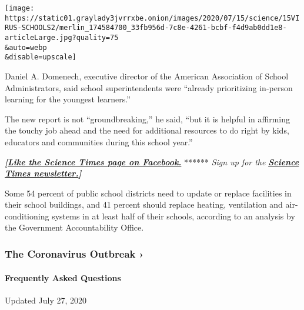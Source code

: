 \texttt{[image: https://static01.graylady3jvrrxbe.onion/images/2020/07/15/science/15VIRUS-SCHOOLS2/merlin\_174584700\_33fb956d-7c8e-4261-bcbf-f4d9ab0dd1e8-articleLarge.jpg?quality=75\\\&auto=webp\\\&disable=upscale]}

Daniel A. Domenech, executive director of the American Association of
School Administrators, said school superintendents were ``already
prioritizing in-person learning for the youngest learners.''

The new report is not ``groundbreaking,'' he said, ``but it is helpful
in affirming the touchy job ahead and the need for additional resources
to do right by kids, educators and communities during this school
year.''

\textbf{\emph{{[}}\href{http://on.fb.me/1paTQ1h}{\emph{Like the Science
Times page on Facebook.}}} ****** \emph{\textbar{} Sign up for the}
\textbf{\href{http://nyti.ms/1MbHaRU}{\emph{Science Times
newsletter.}}\emph{{]}}}

Some 54 percent of public school districts need to update or replace
facilities in their school buildings, and 41 percent should replace
heating, ventilation and air-conditioning systems in at least half of
their schools, according to an analysis by the Government Accountability
Office.

\href{https://www.nytimes3xbfgragh.onion/news-event/coronavirus?action=click\&pgtype=Article\&state=default\&region=MAIN_CONTENT_3\&context=storylines_faq}{}

\hypertarget{the-coronavirus-outbreak-}{%
\subsubsection{The Coronavirus Outbreak
›}\label{the-coronavirus-outbreak-}}

\hypertarget{frequently-asked-questions}{%
\paragraph{Frequently Asked
Questions}\label{frequently-asked-questions}}

Updated July 27, 2020


